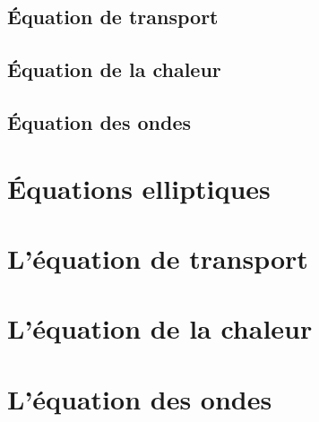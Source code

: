 \documentclass[12pt,a4paper,twoside]{article}
\begin{document}
\subsection{\'Equation de transport}


\subsection{\'Equation de la chaleur}

\subsection{\'Equation des ondes}

\section{\'Equations elliptiques}

\section{L'\'equation de transport}

\section{L'\'equation de la chaleur}

\section{L'\'equation des ondes}


\end{document}
